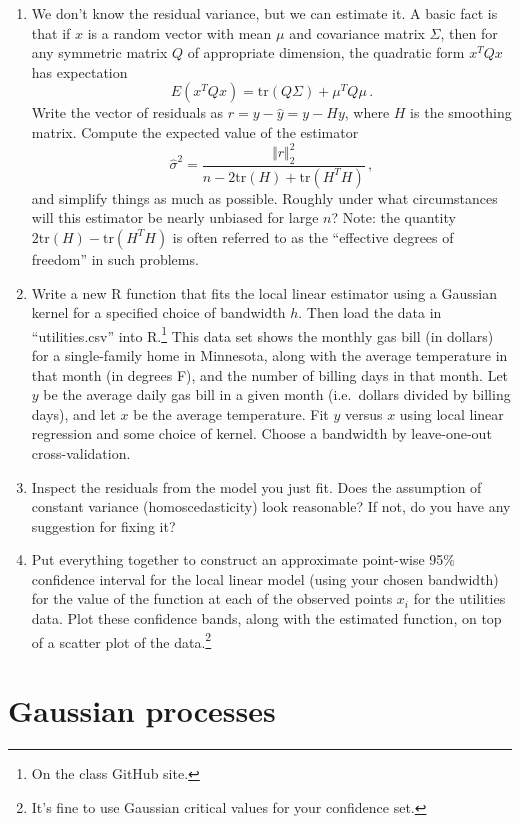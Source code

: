 \documentclass{homework}
\begin{document}
\begin{enumerate}[label=(\Alph*)]
\item We don't know the residual variance, but we can estimate it.  A basic fact is that if $x$ is a random vector with mean $\mu$ and covariance matrix $\Sigma$, then for any symmetric matrix $Q$ of appropriate dimension, the quadratic form $x^T Q x$ has expectation
$$
E(x^T Q x) = \mbox{tr}(Q \Sigma) + \mu^T Q \mu \, .
$$
Write the vector of residuals as $r = y - \hat{y} = y - Hy$, where $H$ is the smoothing matrix.  Compute the expected value of the estimator
$$
\hat{\sigma}^2 = \frac{\Vert r \Vert_2^2}{n - 2\mbox{tr}(H) + \mbox{tr}(H^T H)} \, ,
$$
and simplify things as much as possible.  Roughly under what circumstances will this estimator be nearly unbiased for large $n$?  Note: the quantity $2\mbox{tr}(H) - \mbox{tr}(H^T H)$ is often referred to as the ``effective degrees of freedom'' in such problems.

\item Write a new R function that fits the local linear estimator using a Gaussian kernel for a specified choice of bandwidth $h$. Then load the data in ``utilities.csv'' into R.\footnote{On the class GitHub site.}  This data set shows the monthly gas bill (in dollars) for a single-family home in Minnesota, along with the average temperature in that month (in degrees F), and the number of billing days in that month.  Let $y$ be the average daily gas bill in a given month (i.e.~dollars divided by billing days), and let $x$ be the average temperature.  Fit $y$ versus $x$ using local linear regression and some choice of kernel.  Choose a bandwidth by leave-one-out cross-validation.

\item Inspect the residuals from the model you just fit.  Does the assumption of constant variance (homoscedasticity) look reasonable?  If not, do you have any suggestion for fixing it?

\item Put everything together to construct an approximate point-wise 95\% confidence interval for the local linear model (using your chosen bandwidth) for the value of the function at each of the observed points $x_i$ for the utilities data.  Plot these confidence bands, along with the estimated function, on top of a scatter plot of the data.\footnote{It's fine to use Gaussian critical values for your confidence set.}

\end{enumerate}


\section{Gaussian processes}
\end{document}
